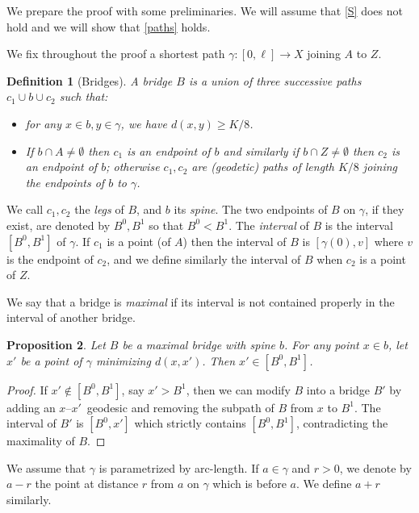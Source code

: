 \documentclass[a4paper]{article}
\newcommand{\defi}[1]{{\color{darkgray}\emph{#1}}}
\newtheorem{proposition}{Proposition}[section]
\newtheorem{definition}[proposition]{Definition}
\begin{document}
We prepare the proof with some preliminaries. 
We will assume that \ref{S} does not hold and we will show that \ref{paths} holds.


We fix throughout the proof a shortest path $\gamma :[0,\ell]\to X $ joining $A$ to $Z$.
 
\begin{definition}[Bridges] \label{bridge}
A \textit{bridge} $B$ is a union of three successive paths $c_1\cup b\cup c_2$ 
such that:

\begin{itemize}
\item for any $x\in b, y\in \gamma $, we have  $d(x,y)\geq K/8$.

\item If $b\cap A\ne \emptyset $ then $c_1$ is an endpoint of $b$ and similarly if
$b\cap Z\ne \emptyset $ then $c_2$ is an endpoint of $b$; otherwise
$c_1,c_2$ are (geodetic) paths of length $K/8$ joining the endpoints
of $b$ to $\gamma $. 

\end{itemize}

\end{definition}

We call $c_1,c_2$ the \defi{legs} of $B$, and $b$ its \defi{spine}. The two endpoints of $B$ on $\gamma$, if they exist, are denoted by $B^0,B^1$ so that $B^0< B^1$. The \defi{interval} of $B$ is the interval $[B^0,B^1]$ of $\gamma$. If $c_1$ is a point (of $A$) then the interval of $B$ is $[\gamma (0),v]$ where $v$ is the
endpoint of $c_2$, and we define similarly the interval of $B$ when $c_2$ is a point of $Z$.

We say that a bridge is \textit{maximal} if its interval is not contained properly in the interval of another bridge.	
 
\begin{proposition} \label{max}
Let $B$ be a maximal bridge with spine $b$. For any point $x\in b$, let $x'$ be a point of $\gamma$ minimizing $d(x,x')$. Then $x'\in [B^0,B^1]$.
\end{proposition}
\begin{proof}
If $x'\not\in [B^0,B^1]$, say $x'>B^1$, then we can modify $B$ into a bridge $B'$ by adding an $x$--$x'$~geodesic and removing the subpath of $B$ from $x$ to $B^1$. The interval of $B'$ is $[B^0,x']$ which strictly contains $[B^0,B^1]$, contradicting the maximality of $B$.
\end{proof}

We assume that $\gamma $ is parametrized by arc-length. If $a\in \gamma $ and $r>0$, we denote by 
$a-r$  the point at distance $r$ from $a$ on $\gamma $ which is before $a$. We define $a+r$ similarly.
\end{document}
